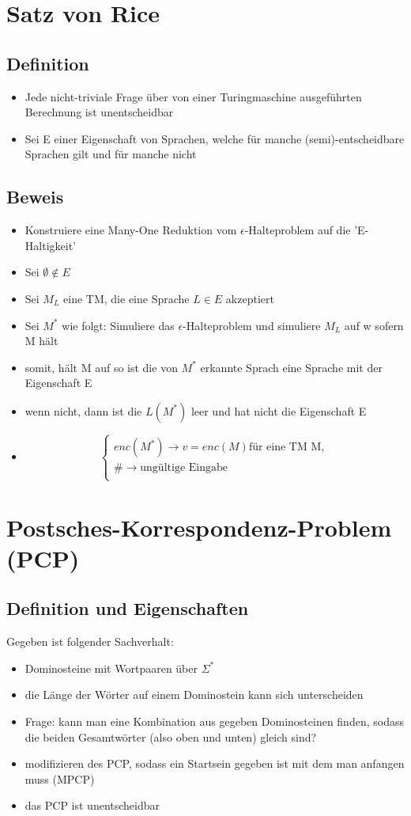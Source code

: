 \documentclass[12pt,a4paper]{article}
\begin{document}
\section{Satz von Rice}

\subsection{Definition}
\begin{itemize}
\item Jede nicht-triviale Frage über von einer Turingmaschine ausgeführten Berechnung ist unentscheidbar
\item Sei E einer Eigenschaft von Sprachen, welche für manche (semi)-entscheidbare Sprachen gilt und für manche nicht
\end{itemize}
\subsection{Beweis}
\begin{itemize}
\item Konstruiere eine Many-One Reduktion vom $\epsilon$-Halteproblem auf die 'E-Haltigkeit'
\item Sei $\emptyset \not\in E$
\item Sei $M_L$ eine TM, die eine Sprache $L \in E$ akzeptiert
\item Sei $M^*$ wie folgt: Simuliere das $\epsilon$-Halteproblem und simuliere $M_L$ auf w sofern M hält
\item somit, hält M auf so ist die von $M^*$ erkannte Sprach eine Sprache mit der Eigenschaft E
\item wenn nicht, dann ist die $L(M^*)$ leer und hat nicht die Eigenschaft E
\item $$
\begin{cases}
enc(M^*) \rightarrow v = enc(M) \text{für eine TM M},\\
\# \rightarrow \text{ungültige Eingabe}\\
\end{cases}
$$
\end{itemize}

\section{Postsches-Korrespondenz-Problem (PCP)}
\subsection{Definition und Eigenschaften}
Gegeben ist folgender Sachverhalt:
\begin{itemize}
\item Dominosteine mit Wortpaaren über $\Sigma^*$
\item die Länge der Wörter auf einem Dominostein kann sich unterscheiden
\item Frage: kann man eine Kombination aus gegeben Dominosteinen finden, sodass die beiden Gesamtwörter (also oben und unten) gleich sind?
\item modifizieren des PCP, sodass ein Startsein gegeben ist mit dem man anfangen muss (MPCP)
\item das PCP ist unentscheidbar
\end{itemize}
\end{document}
